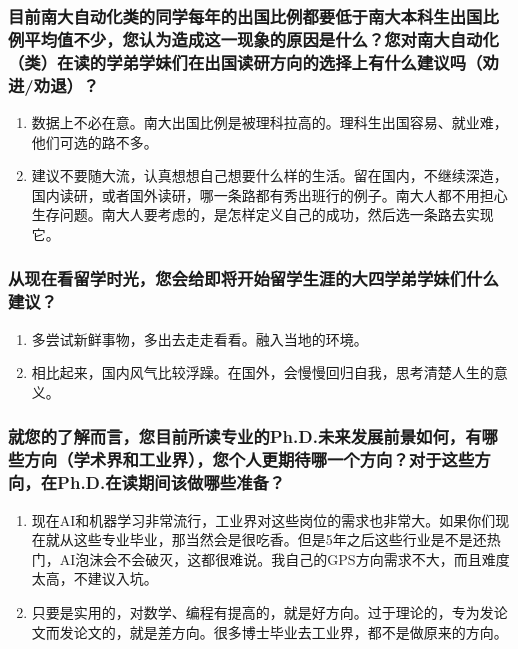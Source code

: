 \documentclass[a4paper,UTF8]{book}
\begin{document}
    \subsubsection*{目前南大自动化类的同学每年的出国比例都要低于南大本科生出国比例平均值不少，您认为造成这一现象的原因是什么？您对南大自动化（类）在读的学弟学妹们在出国读研方向的选择上有什么建议吗（劝进/劝退）？}
        \begin{enumerate}[itemindent=0pt,itemsep=0pt,parsep=0pt]
            \item 数据上不必在意。南大出国比例是被理科拉高的。理科生出国容易、就业难，他们可选的路不多。
            \item 建议不要随大流，认真想想自己想要什么样的生活。留在国内，不继续深造，国内读研，或者国外读研，哪一条路都有秀出班行的例子。南大人都不用担心生存问题。南大人要考虑的，是怎样定义自己的成功，然后选一条路去实现它。
        \end{enumerate}
    \subsubsection*{从现在看留学时光，您会给即将开始留学生涯的大四学弟学妹们什么建议？}
        \begin{enumerate}[itemindent=0pt,itemsep=0pt,parsep=0pt]
            \item 多尝试新鲜事物，多出去走走看看。融入当地的环境。
            \item 相比起来，国内风气比较浮躁。在国外，会慢慢回归自我，思考清楚人生的意义。
        \end{enumerate}
    \subsubsection*{就您的了解而言，您目前所读专业的Ph.D.未来发展前景如何，有哪些方向（学术界和工业界），您个人更期待哪一个方向？对于这些方向，在Ph.D.在读期间该做哪些准备？}
        \begin{enumerate}[itemindent=0pt,itemsep=0pt,parsep=0pt]
            \item 现在AI和机器学习非常流行，工业界对这些岗位的需求也非常大。如果你们现在就从这些专业毕业，那当然会是很吃香。但是5年之后这些行业是不是还热门，AI泡沫会不会破灭，这都很难说。我自己的GPS方向需求不大，而且难度太高，不建议入坑。
            \item 只要是实用的，对数学、编程有提高的，就是好方向。过于理论的，专为发论文而发论文的，就是差方向。很多博士毕业去工业界，都不是做原来的方向。
        \end{enumerate}
\end{document}
